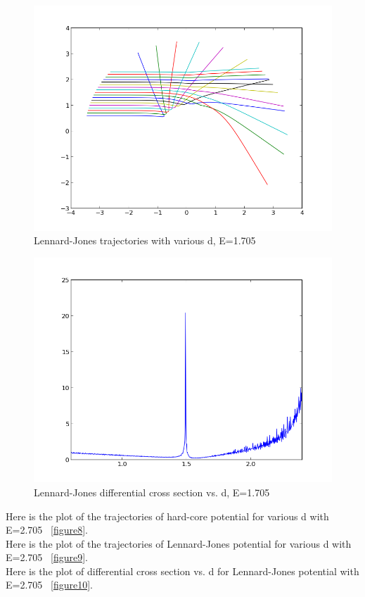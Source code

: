 \documentclass[11pt,letterpaper]{article}
\begin{document}
\begin{figure}
\begin{center}
\includegraphics[width=0.9\linewidth,angle=0]{p2alldtra1715.png}
\caption{Lennard-Jones trajectories with various d, E=1.705}
\label{figure6}
\end{center}
\end{figure}

\begin{figure}
\begin{center}
\includegraphics[width=0.9\linewidth,angle=0]{p2diffE1705.png}
\caption{Lennard-Jones differential cross section vs. d, E=1.705}
\label{figure7}
\end{center}
\end{figure}


Here is the plot of the trajectories of hard-core potential for various d with E=2.705 ~\ref{figure8}.\\
Here is the plot of the trajectories of Lennard-Jones potential for various d with E=2.705 ~\ref{figure9}.\\
Here is the plot of differential cross section vs. d for Lennard-Jones potential with E=2.705 ~\ref{figure10}.\\
\end{document}
